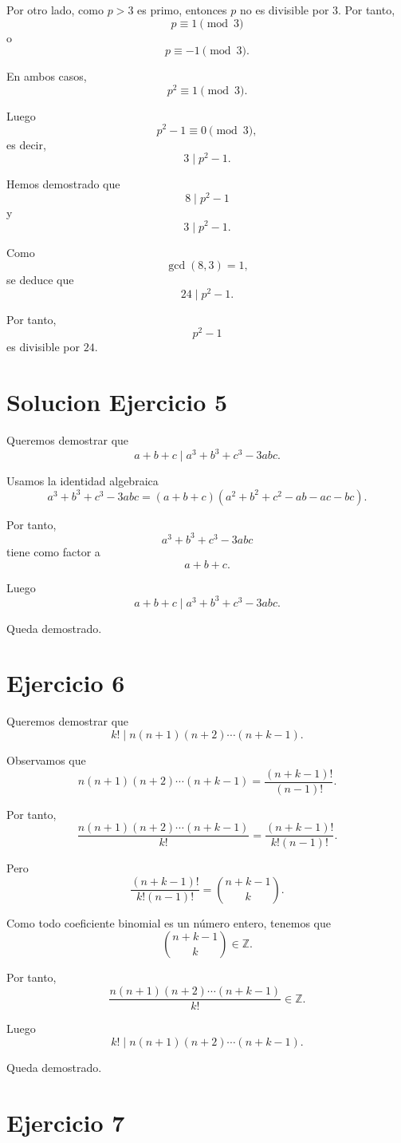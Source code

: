 \documentclass[12pt]{article}
\begin{document}
Por otro lado, como \(p>3\) es primo, entonces \(p\) no es divisible por \(3\). Por tanto,
\[
p\equiv 1 \pmod 3
\]
o
\[
p\equiv -1 \pmod 3.
\]

En ambos casos,
\[
p^2\equiv 1 \pmod 3.
\]

Luego
\[
p^2-1\equiv 0 \pmod 3,
\]
es decir,
\[
3 \mid p^2-1.
\]

Hemos demostrado que
\[
8 \mid p^2-1
\]
y
\[
3 \mid p^2-1.
\]

Como
\[
\gcd(8,3)=1,
\]
se deduce que
\[
24 \mid p^2-1.
\]

Por tanto,
\[
p^2-1
\]
es divisible por \(24\).

\section*{Solucion Ejercicio 5}

Queremos demostrar que
\[
a+b+c \mid a^3+b^3+c^3-3abc.
\]

Usamos la identidad algebraica
\[
a^3+b^3+c^3-3abc
=
(a+b+c)(a^2+b^2+c^2-ab-ac-bc).
\]

Por tanto,
\[
a^3+b^3+c^3-3abc
\]
tiene como factor a
\[
a+b+c.
\]

Luego
\[
a+b+c \mid a^3+b^3+c^3-3abc.
\]

Queda demostrado.

\section*{Ejercicio 6}

Queremos demostrar que
\[
k! \mid n(n+1)(n+2)\cdots(n+k-1).
\]

Observamos que
\[
n(n+1)(n+2)\cdots(n+k-1)
=
\frac{(n+k-1)!}{(n-1)!}.
\]

Por tanto,
\[
\frac{n(n+1)(n+2)\cdots(n+k-1)}{k!}
=
\frac{(n+k-1)!}{k!(n-1)!}.
\]

Pero
\[
\frac{(n+k-1)!}{k!(n-1)!}
=
\binom{n+k-1}{k}.
\]

Como todo coeficiente binomial es un número entero, tenemos que
\[
\binom{n+k-1}{k}\in\mathbb{Z}.
\]

Por tanto,
\[
\frac{n(n+1)(n+2)\cdots(n+k-1)}{k!}\in\mathbb{Z}.
\]

Luego
\[
k! \mid n(n+1)(n+2)\cdots(n+k-1).
\]

Queda demostrado.

\section*{Ejercicio 7}
\end{document}
